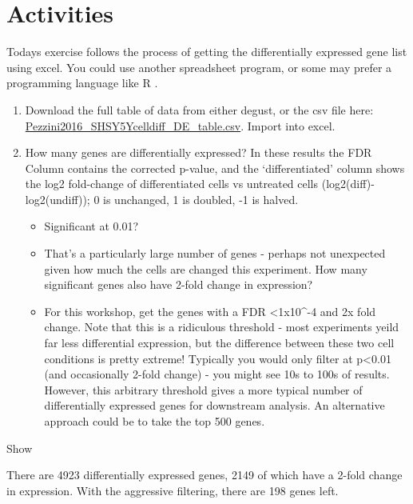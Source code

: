 \documentclass[
]{book}
\begin{document}
\hypertarget{activities}{%
\section{Activities}\label{activities}}

Todays exercise follows the process of getting the differentially expressed gene list using excel. You could use another spreadsheet program, or some may prefer a programming language like R .

\begin{enumerate}
\def\labelenumi{\arabic{enumi}.}
\item
  Download the full table of data from either degust, or the csv file here:
  \href{https://monashbioinformaticsplatform.github.io/enrichment_analysis_workshop/data/Pezzini2016_SHSY5Ycelldiff_DE_table.csv}{Pezzini2016\_SHSY5Ycelldiff\_DE\_table.csv}. Import into excel.
\item
  How many genes are differentially expressed? In these results the FDR Column contains the corrected p-value, and the `differentiated' column shows the log2 fold-change of differentiated cells vs untreated cells (log2(diff)-log2(undiff)); 0 is unchanged, 1 is doubled, -1 is halved.

  \begin{itemize}
  \item
    Significant at 0.01?
  \item
    That's a particularly large number of genes - perhaps not unexpected given how much the cells are changed this experiment. How many significant genes also have 2-fold change in expression?
  \item
    For this workshop, get the genes with a FDR \textless1x10\^{}-4 and 2x fold change. Note that this is a ridiculous threshold - most experiments yeild far less differential expression, but the difference between these two cell conditions is pretty extreme! Typically you would only filter at p\textless0.01 (and occasionally 2-fold change) - you might see 10s to 100s of results. However, this arbitrary threshold gives a more typical number of differentially expressed genes for downstream analysis. An alternative approach could be to take the top 500 genes.
  \end{itemize}
\end{enumerate}

Show

There are 4923 differentially expressed genes, 2149 of which have a 2-fold change in expression. With the aggressive filtering, there are 198 genes left.
\end{document}

